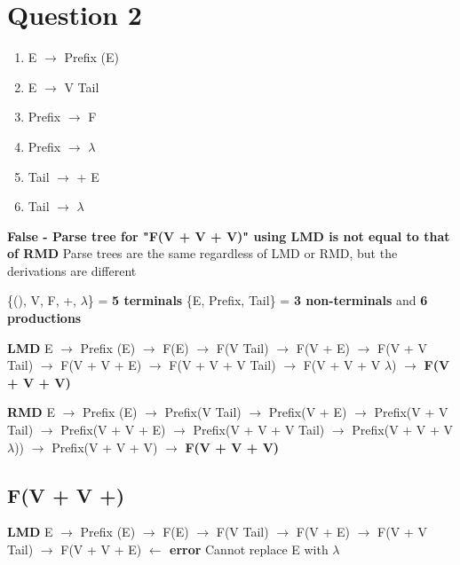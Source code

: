\documentclass{report}
\begin{document}
\section{Question 2}
  \begin{enumerate}
    \setlength\itemsep{-.25em}
    \renewcommand{\labelenumii}{\arabic{enumii}.}
    \item E $\rightarrow$ Prefix (E)
    \item E $\rightarrow$ V Tail
    \item Prefix $\rightarrow$ F
    \item Prefix $\rightarrow$ $\lambda$
    \item Tail $\rightarrow$ + E
    \item Tail $\rightarrow$ $\lambda$
  \end{enumerate}
\setlength{\leftskip}{1em}
\textbf{False - Parse tree for "F(V + V + V)" using LMD is not equal to that of RMD}\newline
Parse trees are the same regardless of LMD or RMD, but the derivations are different\newline

\noindent\{(), V, F, +, $\lambda$\} = \textbf{5 terminals} \{E, Prefix, Tail\} = \textbf{3 non-terminals} and \textbf{6 productions}\newline

\noindent\textbf{LMD}\newline
E $\rightarrow$ Prefix (E) $\rightarrow$ F(E) $\rightarrow$ F(V Tail) $\rightarrow$ F(V + E)
$\rightarrow$ F(V + V Tail) $\rightarrow$ F(V + V + E)\newline
\indent\hspace{-.2cm}$\rightarrow$ F(V + V + V Tail) $\rightarrow$ F(V + V + V $\lambda$)
$\rightarrow$ \textbf{F(V + V + V)}\newline

\noindent\textbf{RMD}\newline
E $\rightarrow$ Prefix (E) $\rightarrow$ Prefix(V Tail) $\rightarrow$ Prefix(V + E)
$\rightarrow$ Prefix(V + V Tail) $\rightarrow$ Prefix(V + V + E)\newline
\indent\hspace{-.2cm}$\rightarrow$ Prefix(V + V + V Tail) $\rightarrow$ Prefix(V + V + V $\lambda$))
$\rightarrow$ Prefix(V + V + V) $\rightarrow$ \textbf{F(V + V + V)}\newline
\vspace{-1em}
\subsection{F(V + V +)}
\noindent\textbf{LMD}\newline
E $\rightarrow$ Prefix (E) $\rightarrow$ F(E) $\rightarrow$ F(V Tail) $\rightarrow$ F(V + E)
$\rightarrow$ F(V + V Tail) $\rightarrow$ F(V + V + E) \textbf{$\leftarrow$ error}\newline
Cannot replace E with $\lambda$\newline
\end{document}
